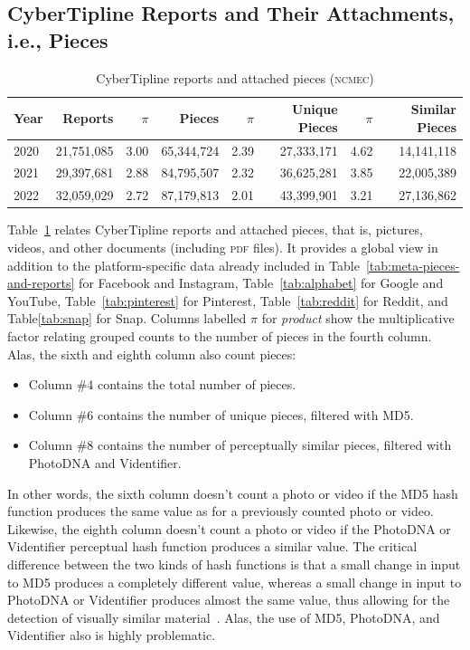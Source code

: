 \documentclass[nonacm,screen]{acmart}
\newcommand\V[1]{\textsc{\MakeLowercase{#1}}}
\begin{document}
\subsection{CyberTipline Reports and Their Attachments, i.e., Pieces}
\label{sec:pieces-and-reports}

\begin{table}
\centering\libertineLF
\caption{CyberTipline reports and attached pieces (\V{NCMEC})}
\label{tab:reports-pieces}
\begin{tabular}{l|rr|r|rr|rr}
\textbf{Year} & \textbf{Reports} & $\pi$ & \textbf{Pieces}
& $\pi$ & \textbf{Unique Pieces} & $\pi$ & \textbf{Similar Pieces} \\ \hline
2020 & 21,751,085 & 3.00 & 65,344,724 & 2.39 & 27,333,171 & 4.62 & 14,141,118 \\
2021 & 29,397,681 & 2.88 & 84,795,507 & 2.32 & 36,625,281 & 3.85 & 22,005,389 \\
2022 & 32,059,029 & 2.72 & 87,179,813 & 2.01 & 43,399,901 & 3.21 & 27,136,862 \\
\end{tabular}
\end{table}

Table~\ref{tab:reports-pieces} relates CyberTipline reports and attached pieces,
that is, pictures, videos, and other documents (including \V{PDF} files). It
provides a global view in addition to the platform-specific data already
included in Table~\ref{tab:meta-pieces-and-reports} for Facebook and Instagram,
Table~\ref{tab:alphabet} for Google and YouTube, Table~\ref{tab:pinterest} for
Pinterest, Table~\ref{tab:reddit} for Reddit, and Table\ref{tab:snap} for Snap.
Columns labelled $\pi$ for \emph{product} show the multiplicative factor
relating grouped counts to the number of pieces in the fourth column. Alas, the
sixth and eighth column also count pieces:
\begin{itemize}
    \item Column \#4 contains the total number of pieces.
    \item Column \#6 contains the number of unique pieces, filtered with MD5.
    \item Column \#8 contains the number of perceptually similar pieces,
    filtered with PhotoDNA and Videntifier.
\end{itemize}
In other words, the sixth column doesn't count a photo or video if the MD5 hash
function produces the same value as for a previously counted photo or video.
Likewise, the eighth column doesn't count a photo or video if the PhotoDNA or
Videntifier perceptual hash function produces a similar value. The critical
difference between the two kinds of hash functions is that a small change in
input to MD5 produces a completely different value, whereas a small change in
input to PhotoDNA or Videntifier produces almost the same value, thus allowing
for the detection of visually similar material~\cite{Farid2021}. Alas, the use
of MD5, PhotoDNA, and Videntifier also is highly problematic.
\end{document}
